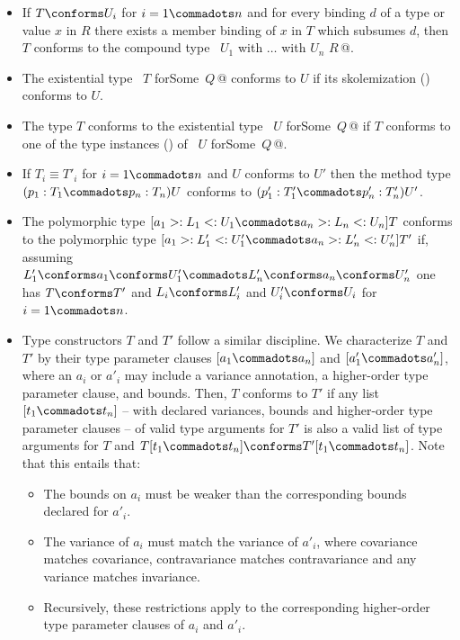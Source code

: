 \begin{itemize}
\item If $T \conforms U_i$ for $i = 1 \commadots n$ and for every
      binding $d$ of a type or value $x$ in $R$ there exists a member
      binding of $x$ in $T$ which subsumes $d$, then $T$ conforms to the
      compound type ~\lstinline@$U_1$ with $\ldots$ with $U_n$ {$R\,$}@.
\item The existential type ~\lstinline@$T$ forSome {$\,Q\,$}@ conforms to 
      $U$ if its skolemization ()
      conforms to $U$.
\item The type $T$ conforms to the existential type ~\lstinline@$U$ forSome {$\,Q\,$}@ 
      if $T$ conforms to one of the type instances () 
      of ~\lstinline@$U$ forSome {$\,Q\,$}@.
\item If
        $T_i \equiv T'_i$ for $i = 1 \commadots n$ and $U$ conforms to $U'$ 
        then the method type $(p_1:T_1 \commadots p_n:T_n) U$ conforms to
        $(p'_1:T'_1 \commadots p'_n:T'_n) U'$.
\item The polymorphic type
$[a_1 >: L_1 <: U_1 \commadots a_n >: L_n <: U_n] T$ conforms to the polymorphic type
$[a_1 >: L'_1 <: U'_1 \commadots a_n >: L'_n <: U'_n] T'$ if, assuming
$L'_1 \conforms a_1 \conforms U'_1 \commadots L'_n \conforms a_n \conforms U'_n$ 
one has $T \conforms T'$ and $L_i \conforms L'_i$ and $U'_i \conforms U_i$
for $i = 1 \commadots n$.
\item Type constructors $T$ and $T'$ follow a similar discipline. We characterize $T$ and $T'$ by their type parameter clauses
$[a_1 \commadots a_n]$ and
$[a'_1 \commadots a'_n ]$, where an $a_i$ or $a'_i$ may include a variance annotation, a higher-order type parameter clause, and bounds. Then, $T$ conforms to $T'$ if any list $[t_1 \commadots t_n]$ -- with declared variances, bounds and higher-order type parameter clauses -- of valid type arguments for $T'$ is also a valid list of type arguments for $T$ and $T[t_1 \commadots t_n] \conforms T'[t_1 \commadots t_n]$. Note that this entails that:
      \begin{itemize}
      \item
      The bounds on $a_i$ must be weaker than the corresponding bounds declared for $a'_i$. 
      \item 
      The variance of $a_i$ must match the variance of $a'_i$, where covariance matches covariance, contravariance matches contravariance and any variance matches invariance.
      \item 
      Recursively, these restrictions apply to the corresponding higher-order type parameter clauses of $a_i$ and $a'_i$.
      \end{itemize}

\end{itemize}


